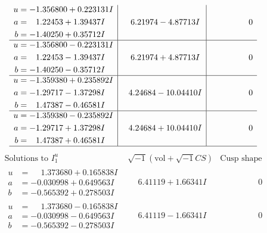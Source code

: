 \documentclass[1p]{elsarticle_modified}
\theoremstyle{definition}
\newcommand{\I}{\sqrt{-1}}
\begin{document}
$$\begin{array}{c|c|c}
\begin{aligned}
u &= -1.356800 + 0.223131 I \\
a &= \phantom{-}1.22453 + 1.39437 I \\
b &= -1.40250 + 0.35712 I\end{aligned}
 & \phantom{-}6.21974 - 4.87713 I & \phantom{-0.000000 } 0 \\ \hline\begin{aligned}
u &= -1.356800 - 0.223131 I \\
a &= \phantom{-}1.22453 - 1.39437 I \\
b &= -1.40250 - 0.35712 I\end{aligned}
 & \phantom{-}6.21974 + 4.87713 I & \phantom{-0.000000 } 0 \\ \hline\begin{aligned}
u &= -1.359380 + 0.235892 I \\
a &= -1.29717 - 1.37298 I \\
b &= \phantom{-}1.47387 - 0.46581 I\end{aligned}
 & \phantom{-}4.24684 - 10.04410 I & \phantom{-0.000000 } 0 \\ \hline\begin{aligned}
u &= -1.359380 - 0.235892 I \\
a &= -1.29717 + 1.37298 I \\
b &= \phantom{-}1.47387 + 0.46581 I\end{aligned}
 & \phantom{-}4.24684 + 10.04410 I & \phantom{-0.000000 } 0\\
 \hline 
 \end{array}$$\newpage$$\begin{array}{c|c|c}  
\text{Solutions to }I^u_{1}& \I (\text{vol} + \sqrt{-1}CS) & \text{Cusp shape}\\
 \hline 
\begin{aligned}
u &= \phantom{-}1.373680 + 0.165838 I \\
a &= -0.030998 + 0.649563 I \\
b &= -0.565392 + 0.278503 I\end{aligned}
 & \phantom{-}6.41119 + 1.66341 I & \phantom{-0.000000 } 0 \\ \hline\begin{aligned}
u &= \phantom{-}1.373680 - 0.165838 I \\
a &= -0.030998 - 0.649563 I \\
b &= -0.565392 - 0.278503 I\end{aligned}
 & \phantom{-}6.41119 - 1.66341 I & \phantom{-0.000000 } 0 \\ \hline\begin{aligned}

\end{aligned}
\end{array}$$
\end{document}
